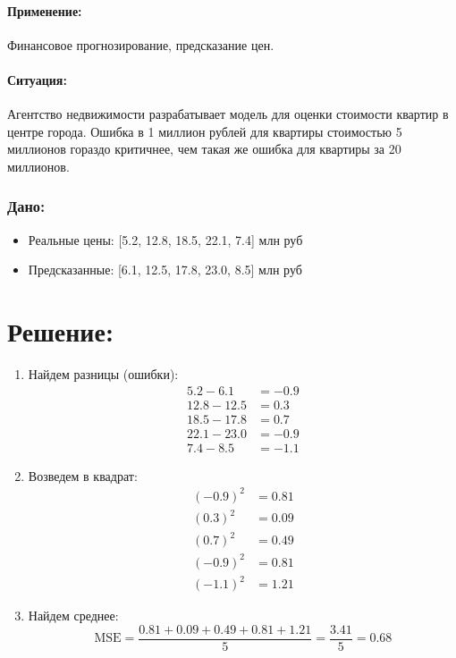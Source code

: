 \paragraph{Применение:} Финансовое прогнозирование, предсказание цен.

\paragraph{Ситуация:} Агентство недвижимости разрабатывает модель для оценки стоимости квартир в центре города. Ошибка в 1 миллион рублей для квартиры стоимостью 5 миллионов гораздо критичнее, чем такая же ошибка для квартиры за 20 миллионов.

\subsubsection*{Дано:}
\begin{itemize}
    \item Реальные цены: [5.2, 12.8, 18.5, 22.1, 7.4] млн руб
    \item Предсказанные: [6.1, 12.5, 17.8, 23.0, 8.5] млн руб
\end{itemize}


\section*{Решение:}

\begin{enumerate}
    \item {Найдем разницы (ошибки):}
          \[
              \begin{aligned}
                  5.2 - 6.1   & = -0.9 \\
                  12.8 - 12.5 & = 0.3  \\
                  18.5 - 17.8 & = 0.7  \\
                  22.1 - 23.0 & = -0.9 \\
                  7.4 - 8.5   & = -1.1
              \end{aligned}
          \]

    \item {Возведем в квадрат:}
          \[
              \begin{aligned}
                  (-0.9)^2 & = 0.81 \\
                  (0.3)^2  & = 0.09 \\
                  (0.7)^2  & = 0.49 \\
                  (-0.9)^2 & = 0.81 \\
                  (-1.1)^2 & = 1.21
              \end{aligned}
          \]

    \item {Найдем среднее:}
          \[
              \text{MSE} = \frac{0.81 + 0.09 + 0.49 + 0.81 + 1.21}{5} = \frac{3.41}{5} = 0.68
          \]
\end{enumerate}

